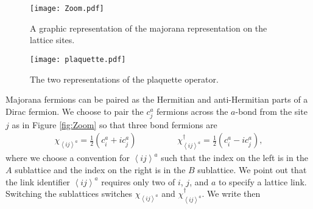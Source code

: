 \documentclass[aps,pra,preprint,groupedaddress]{revtex4-1}
\newcommand{\1}{\mathds{1}}
\begin{document}
\begin{figure}
	\centering
	\begin{minipage}{.49\textwidth}
		\centering
		\texttt{[image: Zoom.pdf]}
		\caption{A graphic representation of the majorana representation on the lattice sites.} %
		\label{fig:Zoom}
	\end{minipage} %
	\begin{minipage}{.49\textwidth}
		\centering
		\texttt{[image: plaquette.pdf]}
		\caption{The two representations of the plaquette operator.}
		\label{fig:plaquette}
	\end{minipage}
\end{figure}

Majorana fermions can be paired as the Hermitian and anti-Hermitian parts of a Dirac fermion. We choose to pair the $c^a_j$ fermions across the $a$-bond from the site $j$ as in Figure \ref{fig:Zoom} so that three bond fermions are
\begin{align}
\chi_{\left<ij\right>^a} = \frac{1}{2}\left( c^a_i + i c^a_j \right) \hspace{2cm}
\chi_{\left<ij\right>^a}^\dagger = \frac{1}{2}\left( c^a_i - i c^a_j \right),  \label{chi}
\end{align}
where we choose a convention for $\left<ij\right>^a$ such that the index on the left is in the $A$ sublattice and the index on the right is in the $B$ sublattice. We point out that the link identifier $\left<ij\right>^a$ requires only two of $i$, $j$, and $a$ to specify a lattice link. Switching the sublattices switches $\chi_{\left<ij\right>^a}$ and $\chi_{\left<ij\right>^a}^\dagger$.  We write then
\end{document}

